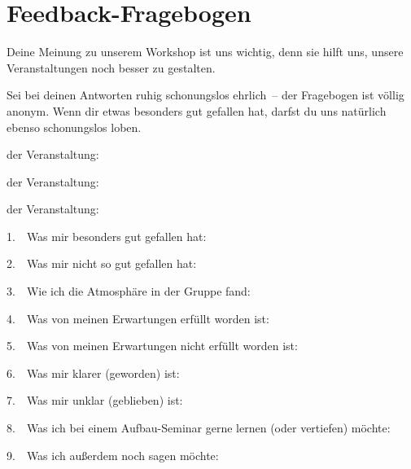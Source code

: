 \documentclass[a4paper,12pt]{scrartcl}
\begin{document}
\raggedbottom

\section*{Feedback-Fragebogen}

Deine Meinung zu unserem Workshop ist uns wichtig, denn sie hilft uns, unsere Veranstaltungen noch besser zu gestalten.

Sei bei deinen Antworten ruhig schonungslos ehrlich~-- der Fragebogen ist völlig anonym. Wenn dir etwas besonders gut gefallen hat, darfst du uns natürlich ebenso schonungslos loben.

 der Veranstaltung:

 der Veranstaltung:

 der Veranstaltung:
\vspace{1em}


1.~~Was mir besonders gut gefallen hat:
\answerspace

2.~~Was mir nicht so gut gefallen hat:
\answerspace

3.~~Wie ich die Atmosphäre in der Gruppe fand:
\answerspace

4.~~Was von meinen Erwartungen erfüllt worden ist:
\answerspace

5.~~Was von meinen Erwartungen nicht erfüllt worden ist:
\answerspace

6.~~Was mir klarer (geworden) ist:
\answerspace

7.~~Was mir unklar (geblieben) ist:
\answerspace

8.~~Was ich bei einem Aufbau-Seminar gerne lernen (oder vertiefen) möchte:
\answerspace

9.~~Was ich außerdem noch sagen möchte:
\end{document}
